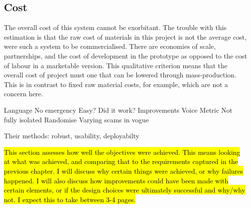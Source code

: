 \documentclass[main.tex]{subfiles}
\begin{document}
\subsection{Cost}
The overall cost of this system cannot be exorbitant. The trouble with this estimation is that the raw cost of materials in this project is not the average cost, were such a system to be commercialised. There are economies of scale, partnerships, and the cost of development in the prototype as opposed to the cost of labour in a marketable version. This qualitative criterion means that the overall cost of project must one that can be lowered through mass-production. This is in contrast to fixed raw material costs, for example, which are not a concern here.

Language
No emergency
Easy?
Did it work?
Improvements
Voice Metric
Not fully isolated
Randomise
Varying scams in vogue

Their methods: robust, usability, deployabilty


\hl{This section assesses how well the objectives were achieved. This means looking at what was achieved, and comparing that to the requirements captured in the previous chapter. I will discuss why certain things were achieved, or why failures happened. I will also discuss how improvements could have been made with certain elements, or if the design choices were ultimately successful and why/why not. I expect this to take between 3-4 pages.}
\end{document}
